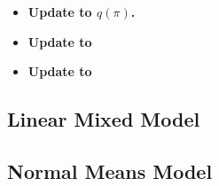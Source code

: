 \documentclass{article}
\begin{document}
\begin{itemize}
\item {\bf Update to $q(\pi)$.} 
\item {\bf Update to } 
\item {\bf Update to }
\end{itemize}


\subsection{Linear Mixed Model}
\label{lmm}


\subsection{Normal Means Model}
\label{normal}
\end{document}
